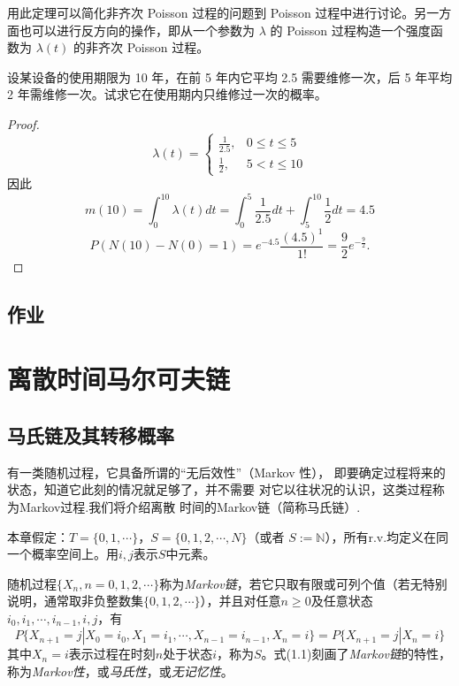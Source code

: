 \documentclass[lang=cn,10pt,thmcnt=section]{elegantbook}
\begin{document}
\begin{remark}

	用此定理可以简化非齐次 Poisson 过程的问题到 Poisson 过程中进行讨论。另一方面也可以进行反方向的操作，即从一个参数为 $\lambda$ 的 Poisson 过程构造一个强度函数为 $\lambda(t)$ 的非齐次 Poisson 过程。
\end{remark}
\begin{example}
	设某设备的使用期限为 10 年，在前 5 年内它平均 2.5 需要维修一次，后 5 年平均 2 年需维修一次。试求它在使用期内只维修过一次的概率。
\end{example}
\begin{proof}
\[
\lambda(t) = 
\begin{cases} 
\frac{1}{2.5}, & 0 \leq t \leq 5 \\
\frac{1}{2}, & 5 < t \leq 10 
\end{cases}
\]
因此
\[
m(10) = \int_{0}^{10} \lambda(t) dt = \int_{0}^{5} \frac{1}{2.5} dt + \int_{5}^{10} \frac{1}{2} dt = 4.5
\]
\[
P(N(10) - N(0) = 1) = e^{-4.5} \frac{(4.5)^1}{1!} = \frac{9}{2} e^{-\frac{9}{2}}.
\]
\end{proof}
\section{作业}








\chapter{离散时间马尔可夫链}

\section{马氏链及其转移概率}
	有一类随机过程，它具备所谓的“无后效性”（Markov 性），
即要确定过程将来的状态，知道它此刻的情况就足够了，并不需要
对它以往状况的认识，这类过程称为Markov过程.我们将介绍离散
时间的Markov链（简称马氏链）.

本章假定：$T = \{0, 1, \cdots\}$，$S = \{0, 1, 2, \cdots, N\}$（或者 $S := \mathbb{N}$），所有r.v.均定义在同一个概率空间上。用$i, j$表示$S$中元素。
\begin{definition}[离散时间马尔可夫链]
	随机过程$\{X_n, n = 0, 1, 2, \cdots\}$称为\textit{Markov链}，若它只取有限或可列个值（若无特别说明，通常取非负整数集$\{0, 1, 2, \cdots\}$），并且对任意$n \geq 0$及任意状态$i_0, i_1, \cdots, i_{n-1}, i, j$，有
\begin{equation}
P\{X_{n+1} = j | X_0 = i_0, X_1 = i_1, \cdots, X_{n-1} = i_{n-1}, X_n = i\} = P\{X_{n+1} = j | X_n = i\}
\end{equation}
其中$X_n = i$表示过程在时刻$n$处于状态$i$，称为$S$。式(1.1)刻画了\textit{Markov链}的特性，称为\textit{Markov性}，或\textit{马氏性}，或\textit{无记忆性}。
\end{definition}
\end{document}
